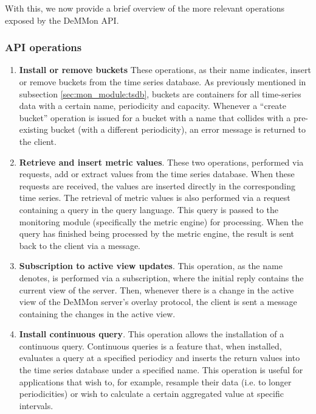 With this, we now provide a brief overview of the more relevant operations exposed by the DeMMon API.

\subsubsection{API operations}

\begin{enumerate}
    \item \textbf{Install or remove buckets} These operations, as their name indicates, insert or remove buckets from the time series database. As previously mentioned in subsection \ref{sec:mon_module:tsdb}, buckets are containers for all time-series data with a certain name, periodicity and capacity. Whenever a ``create bucket'' operation is issued for a bucket with a name that collides with a pre-existing bucket (with a different periodicity), an error message is returned to the client.
    
    \item \textbf{Retrieve and insert metric values}. These two operations, performed via requests, add or extract values from the time series database. When these requests are received, the values are inserted directly in the corresponding time series. The retrieval of metric values is also performed via a request containing a query in the query language. This query is passed to the monitoring module (specifically the metric engine) for processing. When the query has finished being processed by the metric engine, the result is sent back to the client via a message.
    
    \item \textbf{Subscription to active view updates}. This operation, as the name denotes, is performed via a subscription, where the initial reply contains the current view of the server. Then, whenever there is a change in the active view of the DeMMon server's overlay protocol, the client is sent a message containing the changes in the active view.
    
    \item \textbf{Install continuous query}. This operation allows the installation of a continuous query. Continuous queries is a feature that, when installed, evaluates a query at a specified periodicy and inserts the return values into the time series database under a specified name. This operation is useful for applications that wish to, for example, resample their data (i.e. to longer periodicities) or wish to calculate a certain aggregated value at specific intervals. 


\end{enumerate}
